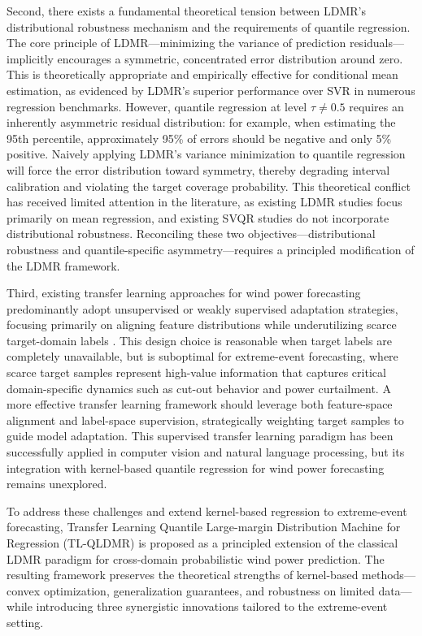 \documentclass[a4paper]{cas-sc}
\begin{document}
Second, there exists a fundamental theoretical tension between LDMR's distributional robustness mechanism and the requirements of quantile regression. The core principle of LDMR—minimizing the variance of prediction residuals—implicitly encourages a symmetric, concentrated error distribution around zero. This is theoretically appropriate and empirically effective for conditional mean estimation, as evidenced by LDMR's superior performance over SVR in numerous regression benchmarks. However, quantile regression at level $\tau \neq 0.5$ requires an inherently asymmetric residual distribution: for example, when estimating the 95th percentile, approximately 95\% of errors should be negative and only 5\% positive. Naively applying LDMR's variance minimization to quantile regression will force the error distribution toward symmetry, thereby degrading interval calibration and violating the target coverage probability. This theoretical conflict has received limited attention in the literature, as existing LDMR studies focus primarily on mean regression, and existing SVQR studies do not incorporate distributional robustness. Reconciling these two objectives—distributional robustness and quantile-specific asymmetry—requires a principled modification of the LDMR framework.

Third, existing transfer learning approaches for wind power forecasting predominantly adopt unsupervised or weakly supervised adaptation strategies, focusing primarily on aligning feature distributions while underutilizing scarce target-domain labels \citep{yin2021serioparallel, wang2024scarcity, dong2023mdan}. This design choice is reasonable when target labels are completely unavailable, but is suboptimal for extreme-event forecasting, where scarce target samples represent high-value information that captures critical domain-specific dynamics such as cut-out behavior and power curtailment. A more effective transfer learning framework should leverage both feature-space alignment and label-space supervision, strategically weighting target samples to guide model adaptation. This supervised transfer learning paradigm has been successfully applied in computer vision and natural language processing, but its integration with kernel-based quantile regression for wind power forecasting remains unexplored.

To address these challenges and extend kernel-based regression to extreme-event forecasting, Transfer Learning Quantile Large-margin Distribution Machine for Regression (TL-QLDMR) is proposed as a principled extension of the classical LDMR paradigm for cross-domain probabilistic wind power prediction. The resulting framework preserves the theoretical strengths of kernel-based methods---convex optimization, generalization guarantees, and robustness on limited data---while introducing three synergistic innovations tailored to the extreme-event setting.
\end{document}
